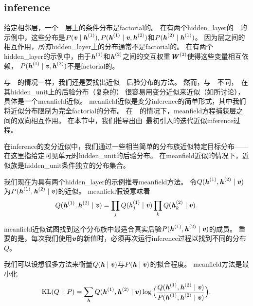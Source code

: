 \subsection{\gls{inference}}
\label{sec:dbm_mean_field_inference}
给定相邻层，一个~~层上的条件分布是\gls{factorial}的。
在有两个\gls{hidden_layer}的~~的示例中，这些分布是$P(\Vv  \mid  \Vh^{(1)}), P(\Vh^{(1)}  \mid  \Vv, \Vh^{(2)})$和$P(\Vh^{(2)}  \mid  \Vh^{(1)})$。
因为层之间的相互作用，\emph{所有}\gls{hidden_layer}上的分布通常不是\gls{factorial}的。
在有两个\gls{hidden_layer}的示例中，由于$\Vh^{(1)}$和$\Vh^{(2)}$之间的交互权重$\MW^{(2)}$使得这些变量相互依赖， $ P(\Vh^{(1)}  \mid  \Vv, \Vh^{(2)})$不是\gls{factorial}的。


与~~的情况一样，我们还是要找出近似~~后验分布的方法。
然而，与~~不同，~在其\gls{hidden_unit}上的后验分布（复杂的） 很容易用变分近似来近似（如所讨论），具体是一个\gls{meanfield}近似。
\gls{meanfield}近似是变分\gls{inference}的简单形式，其中我们将近似分布限制为完全\gls{factorial}的分布。
在~~的情况下，\gls{meanfield}方程捕获层之间的双向相互作用。
在本节中，我们推导出由~\cite{SalHinton09}最初引入的迭代近似\gls{inference}过程。


在\gls{inference}的变分近似中，我们通过一些相当简单的分布族近似特定目标分布——在这里指给定可见单元时\gls{hidden_unit}的后验分布。
在\gls{meanfield}近似的情况下，近似族是\gls{hidden_unit}条件独立的分布集合。


我们现在为具有两个\gls{hidden_layer}的示例推导\gls{meanfield}方法。
令$Q(\Vh^{(1)}, \Vh^{(2)}  \mid  \Vv)$为$P(\Vh^{(1)}, \Vh^{(2)}  \mid  \Vv)$的近似。
\gls{meanfield}假设意味着
\begin{align}
 Q(\Vh^{(1)}, \Vh^{(2)}  \mid  \Vv) = \prod_j Q(h_j^{(1)} \mid  \Vv) \prod_k Q(\Vh_k^{(2)}  \mid  \Vv).
\end{align}

\gls{meanfield}近似试图找到这个分布族中最适合真实后验$P(\Vh^{(1)}, \Vh^{(2)}  \mid  \Vv)$的成员。
重要的是，每次我们使用$\Vv$的新值时，必须再次运行\gls{inference}过程以找到不同的分布$Q$。


我们可以设想很多方法来衡量$Q(\Vh  \mid  \Vv)$与$P(\Vh  \mid  \Vv)$的拟合程度。
\gls{meanfield}方法是最小化
\begin{align}
 \text{KL}(Q \mid  \mid P) = \sum_{\Vh} Q(\Vh^{(1)}, \Vh^{(2)}  \mid  \Vv) 
 \log \Big( \frac{Q(\Vh^{(1)}, \Vh^{(2)}  \mid  \Vv)}{P(\Vh^{(1)}, \Vh^{(2)}  \mid  \Vv)} \Big).
\end{align}

